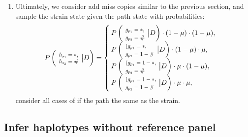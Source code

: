 \documentclass{bioinfo}
\newcommand*{\Scale}[2][4]{\scalebox{#1}{$#2$}}%
\begin{document}
\begin{enumerate}
\item
Ultimately, we consider add miss copies similar to the previous section, and sample the strain state given the path state with probabilities:
\begin{equation*}
P\left(\Scale[0.8]{ \begin{array}{l} h_{s_1} = *, \\h_{s_2} = \# \end{array}}\big{|} D\right) =
\begin{cases}
P\left(\Scale[0.8]{ \begin{array}{l} g_{p_1} = *, \\g_{p_2} = \# \end{array}} \big{|} D\right) \cdot (1-\mu) \cdot (1-\mu), \\%
P\left(\Scale[0.8]{ \begin{array}{l}(g_{p_1} = *, \\g_{p_2} = 1-\# \end{array}}\big{|} D\right) \cdot (1 - \mu) \cdot \mu, \\%
P\left(\Scale[0.8]{ \begin{array}{l}(g_{p_1} = 1-*, \\g_{p_2} = \# \end{array}}\big{|} D\right) \cdot \mu \cdot (1 - \mu), \\%
P\left(\Scale[0.8]{ \begin{array}{l}(g_{p_1} = 1-*, \\g_{p_2} = 1-\# \end{array}}\big{|} D\right) \cdot \mu \cdot \mu, \\%
\end{cases}
\end{equation*}
consider all cases of if the path the same as the strain.
\end{enumerate}




\subsection{Infer haplotypes without reference panel}\label{sec:method.ref}
\end{document}
